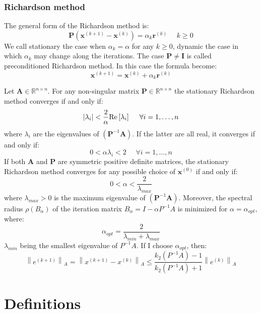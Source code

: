 \documentclass[12pt, a4paper]{report}
\begin{document}
    \subsection{Richardson method}
    The general form of the Richardson method is: 
    \[\boldsymbol{P}(\boldsymbol{x}^{(k+1)}-\boldsymbol{x}^{(k)})=\alpha_k\boldsymbol{r}^{(k)} \:\:\:\:\:\: k \geq 0\]
    We call stationary the case when $\alpha_k=\alpha$ for any $k \geq 0$, dynamic the case in which $\alpha_k$ may change along the iterations. The case 
    $\boldsymbol{P} \neq \boldsymbol{I}$ is called preconditioned Richardson method. In this case the formula become: 
    \[\boldsymbol{x}^{(k+1)}=\boldsymbol{x}^{(k)}+\alpha_k \boldsymbol{r}^{(k)}\]
    \begin{proposition}
        Let $\boldsymbol{A} \in \mathbb{R}^{n \times n}$. For any non-singular matrix $\boldsymbol{P} \in \mathbb{R}^{n \times n}$ the stationary Richardson method converges
        if and only if: 
        \[\left\lvert \lambda_i\right\rvert < \dfrac{2}{\alpha} \textnormal{Re}\left[\lambda_i\right] \:\:\:\:\:\:\forall i=1,\dots,n\]
        where $\lambda_i$ are the eigenvalues of $(\boldsymbol{P}^{-1}\boldsymbol{A})$. If the latter are all real, it converges if and only if: 
        \[0 < \alpha\lambda_i<2 \:\:\:\:\:\:\forall i=1,\dots,n\]
        If both $\boldsymbol{A}$ and $\boldsymbol{P}$ are symmetric positive definite matrices, the stationary Richardson method converges for any possible choice of 
        $\boldsymbol{x}^{(0)}$ if and only if: 
        \[0 < \alpha < \dfrac{2}{\lambda_{max}}\]
        where $\lambda_{max} >0$ is the maximum eigenvalue of $(\boldsymbol{P}^{-1} \boldsymbol{A})$. 
        Moreover, the spectral radius $\rho (B_{\alpha})$ of the iteration matrix $B_{\alpha}=I-\alpha P^{-1}A$ is minimized for $\alpha=\alpha_{opt}$, where: 
        \[\alpha_{opt}=\dfrac{2}{\lambda_{min}+\lambda_{max}}\]
        $\lambda_{min}$ being the smallest eigenvalue of $P^{-1}A$. 
        If I choose $\alpha_{opt}$, then: 
        \[\left\lVert e^{(k+1)}\right\rVert_A= \left\lVert x^{(k+1)}-x^{(k)}\right\rVert_A \leq \dfrac{k_2(P^{-1}A)-1}{k_2(P^{-1}A)+1}\left\lVert e^{(k)}\right\rVert_A\]
    \end{proposition}












\newpage

\chapter{Definitions}
\end{document}
